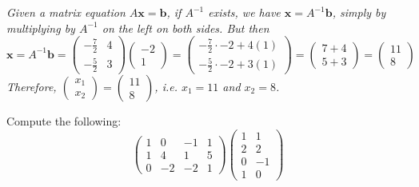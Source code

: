 \documentclass[12pt,letterpaper]{exam}
\begin{document}
\begin{questions}
\begin{parts}
{\itshape Given a matrix equation $A\mathbf{x}= \mathbf{b}$, if $A^{-1}$ exists, we have $\mathbf{x}= A^{-1}\mathbf{b}$, simply by multiplying by $A^{-1}$ on the left on both sides. But then
	\[
	\mathbf{x}= A^{-1}\mathbf{b}= 
	\begin{pmatrix}
	-\frac{7}{2} & 4 \\[0.15cm]
	-\frac{5}{2} & 3
	\end{pmatrix}
	\begin{pmatrix}
	-2 \\
	1
	\end{pmatrix}=
	\begin{pmatrix}
	-\frac{7}{2} \cdot -2 + 4(1) \\
	-\frac{5}{2} \cdot -2 + 3(1)
	\end{pmatrix}= 
	\begin{pmatrix}
	7 + 4 \\
	5 + 3 
	\end{pmatrix}=
	\begin{pmatrix}
	11 \\
	8
	\end{pmatrix}
	\]
Therefore, $\begin{pmatrix} x_1 \\ x_2 \end{pmatrix}= \begin{pmatrix} 11 \\ 8 \end{pmatrix}$, i.e. $x_1= 11$ and $x_2= 8$. 
} \vspace{1.7cm}
\end{parts}





\newpage
\question[12] Compute the following:
	\[
	\begin{pmatrix}
	1 & 0 & -1 & 1 \\
	1 & 4 & 1 & 5 \\
	0 & -2 & -2 & 1 
	\end{pmatrix}
	\begin{pmatrix}
	1 & 1 \\
	2 & 2 \\
	0 & -1 \\
	1 & 0
	\end{pmatrix}
	\] \pspace


\end{questions}
\end{document}
